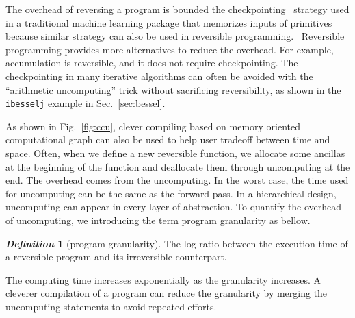 \documentclass[aps,twocolumn,longbibliography,english,superscriptaddress]{revtex4-1}
\newcommand{\<}{\langle}
\renewcommand{\>}{\rangle}
\newcommand{\Fig}[1]{Fig.~\ref{#1}}
\newcommand{\Sec}[1]{Sec.~\ref{#1}}
\theoremstyle{definition}\newtheorem{definition}{\textit{Definition}}
\begin{document}
The overhead of reversing a program is bounded the checkpointing~\cite{Chen2016} strategy used in a traditional machine learning package that memorizes inputs of primitives because similar strategy can also be used in reversible programming.~\cite{Perumalla2013}
Reversible programming provides more alternatives to reduce the overhead.
For example, accumulation is reversible, and it does not require checkpointing.
The checkpointing in many iterative algorithms can often be avoided with the ``arithmetic uncomputing'' trick without sacrificing reversibility, as shown in the \texttt{ibesselj} example in \Sec{sec:bessel}.

As shown in \Fig{fig:ccu}, clever compiling based on memory oriented computational graph can also be used to help user tradeoff between time and space.
Often, when we define a new reversible function, we allocate some ancillas at the beginning of the function and deallocate them through uncomputing at the end.
The overhead comes from the uncomputing. In the worst case, the time used for uncomputing can be the same as the forward pass.
In a hierarchical design, uncomputing can appear in every layer of abstraction. To quantify the overhead of uncomputing, we introducing the term program granularity as bellow.
\begin{definition}[program granularity]
    The log-ratio between the execution time of a reversible program and its irreversible counterpart.
\end{definition}
The computing time increases exponentially as the granularity increases.
A cleverer compilation of a program can reduce the granularity by merging the uncomputing statements to avoid repeated efforts.
\end{document}
